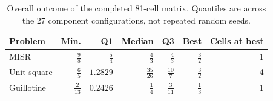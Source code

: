 \begin{table}[tbp]
\centering
\caption{Overall outcome of the completed 81-cell matrix. Quantiles are across the 27 component configurations, not repeated random seeds.}
\label{tab:problem-summary}
\begin{tabular}{lrrrrrr}
\toprule
Problem & Min. & Q1 & Median & Q3 & Best & Cells at best \\
\midrule
MISR & $\frac{9}{8}$ & $\frac{5}{4}$ & $\frac{4}{3}$ & $\frac{4}{3}$ & $\frac{3}{2}$ & 1 \\
Unit-square & $\frac{6}{5}$ & $1.2829$ & $\frac{35}{26}$ & $\frac{10}{7}$ & $\frac{3}{2}$ & 4 \\
Guillotine & $\frac{2}{13}$ & $0.2426$ & $\frac{1}{4}$ & $\frac{3}{11}$ & $\frac{1}{3}$ & 1 \\
\bottomrule
\end{tabular}
\end{table}
